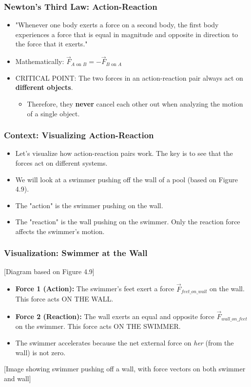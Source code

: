 \documentclass{beamer}
\begin{document}
\begin{frame}
\frametitle{Newton's Third Law: Action-Reaction}
\begin{itemize}
    \item "Whenever one body exerts a force on a second body, the first body experiences a force that is equal in magnitude and opposite in direction to the force that it exerts." \pause
    \item Mathematically: $\vec{F}_{A \text{ on } B} = -\vec{F}_{B \text{ on } A}$ \pause
    \item \alert{CRITICAL POINT}: The two forces in an action-reaction pair always act on \textbf{different objects}. \pause
    \begin{itemize}
        \item Therefore, they \textbf{never} cancel each other out when analyzing the motion of a single object.
    \end{itemize}
\end{itemize}
\end{frame}

\begin{frame}
\frametitle{Context: Visualizing Action-Reaction}
\begin{itemize}
    \item Let's visualize how action-reaction pairs work. The key is to see that the forces act on different systems. \pause
    \item We will look at a swimmer pushing off the wall of a pool (based on Figure 4.9). \pause
    \item The "action" is the swimmer pushing on the wall.
    \item The "reaction" is the wall pushing on the swimmer. Only the reaction force affects the swimmer's motion.
\end{itemize}
\end{frame}

\begin{frame}
\frametitle{Visualization: Swimmer at the Wall}
\begin{alertblock}{[Diagram based on Figure 4.9]}
    \begin{itemize}
        \item \textbf{Force 1 (Action):} The swimmer's feet exert a force $\vec{F}_{feet\_on\_wall}$ on the wall. This force acts ON THE WALL.
        \pause
        \item \textbf{Force 2 (Reaction):} The wall exerts an equal and opposite force $\vec{F}_{wall\_on\_feet}$ on the swimmer. This force acts ON THE SWIMMER.
        \pause
        \item The swimmer accelerates because the net external force on \textit{her} (from the wall) is not zero.
    \end{itemize}
    \alert{[Image showing swimmer pushing off a wall, with force vectors on both swimmer and wall]}
\end{alertblock}
\end{frame}
\end{document}
